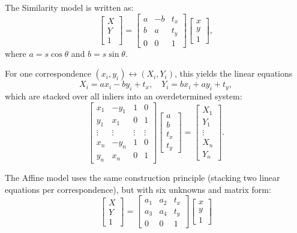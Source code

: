 The Similarity model is written as:
\begin{equation}
\begin{bmatrix} X \\ Y \\ 1 \end{bmatrix} =
\begin{bmatrix}
a & -b & t_x \\
b &  a & t_y \\
0 &  0 & 1
\end{bmatrix}
\begin{bmatrix} x \\ y \\ 1 \end{bmatrix},
\end{equation}
where $a = s\cos\theta$ and $b = s\sin\theta$.

For one correspondence $(x_i, y_i) \leftrightarrow (X_i, Y_i)$, this yields the linear equations
\begin{equation}
X_i = ax_i - by_i + t_x, \quad Y_i = bx_i + ay_i + t_y,
\end{equation}
which are stacked over all inliers into an overdetermined system:
\begin{equation}
\begin{bmatrix}
x_1 & -y_1 & 1 & 0 \\
y_1 &  x_1 & 0 & 1 \\
\vdots & \vdots & \vdots & \vdots \\
x_n & -y_n & 1 & 0 \\
y_n &  x_n & 0 & 1
\end{bmatrix}
\begin{bmatrix} a \\ b \\ t_x \\ t_y \end{bmatrix}
=
\begin{bmatrix} X_1 \\ Y_1 \\ \vdots \\ X_n \\ Y_n \end{bmatrix}.
\end{equation}

The Affine model uses the same construction principle (stacking two linear equations per correspondence), but with six unknowns and matrix form:
\begin{equation}
\begin{bmatrix} X \\ Y \\ 1 \end{bmatrix} =
\begin{bmatrix} a_1 & a_2 & t_x \\ a_3 & a_4 & t_y \\ 0 & 0 & 1 \end{bmatrix}
\begin{bmatrix} x \\ y \\ 1 \end{bmatrix}
\end{equation}

